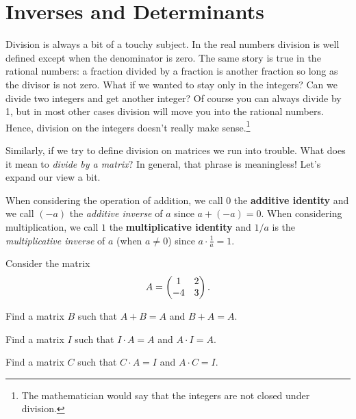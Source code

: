 \newpage\section{Inverses and Determinants} \label{S:10.4.InvDet}
Division is always a bit of a touchy subject.  In the real numbers division is well
defined except when the denominator is zero.  The same story is true in the rational
numbers: a fraction divided by a fraction is another fraction so long as the divisor is
not zero.  What if we wanted to stay only in the integers?  Can we divide two integers and
get another integer?  Of course you can always divide by 1, but in most other cases
division will move you into the rational numbers.  Hence, division on the integers doesn't
really make sense.\footnote{The mathematician would say that the integers are not closed
under division.} 

Similarly, if we try to define division on matrices we run into trouble.  What does it
mean to {\it divide by a matrix}?  In general, that phrase is meaningless!  Let's expand
our view a bit.

When considering the operation of addition, we call $0$ the {\bf additive identity} and we
call $(-a)$ the {\it additive inverse} of $a$ since $a + (-a) = 0$.  When considering
multiplication, we call $1$ the {\bf multiplicative identity} and $1/a$ is the {\it
multiplicative inverse} of $a$ (when $a \ne 0$) since $a \cdot \frac{1}{a} = 1$.  



% 
\begin{problem}
    Consider the matrix
    \[ A = \begin{pmatrix} 1 & 2 \\ -4 & 3 \end{pmatrix}. \]
    \ba
        \item Find a matrix $B$ such that $A + B = A$ and $B + A  = A$.
        \item Find a matrix $I$ such that $I \cdot A = A$ and $A \cdot I = A$.
        \item Find a matrix $C$ such that $C \cdot A = I$ and $A \cdot C = I$.
    \ea
\end{problem}

